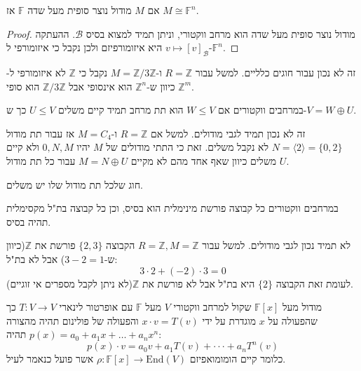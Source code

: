 \documentclass{tstextbook}
\begin{document}
\begin{proposition}
אם \(M\) מודול נוצר סופית מעל שדה \(\mathbb{F}\) אז \(M\cong \mathbb{F}^{n}\).

\end{proposition}
\begin{proof}
מודול נוצר סופית מעל שדה הוא מרחב ווקטורי, וניתן תמיד למצוא בסיס \(\mathcal{B}\). ההעתקה \(v\mapsto[v]_{\mathcal{B}}\) היא איזומורפיזם ולכן נקבל כי איזומורפי ל-\(\mathbb{F}^{n}\).

\end{proof}
\begin{remark}
זה לא נכון עבור חוגים כלליים. למשל עבור \(R=\mathbb{Z}\) ו-\(M=\mathbb{Z} / 3\mathbb{Z}\) נקבל כי \(\mathbb{Z}\) לא איזומורפי ל-\(\mathbb{Z}^{m}\) כיוון ש-\(\mathbb{Z}^{n}\) הוא אינסופי אבל \(\mathbb{Z} / 3\mathbb{Z}\) הוא סופי.

\end{remark}
\begin{reminder}
במרחבים ווקטורים אם \(W\leq V\) הוא תת מרחב תמיד קיים משלים \(U\leq V\) כך ש-\(V=W\oplus U\).

\end{reminder}
\begin{remark}
זה לא נכון תמיד לגבי מודולים. למשל אם \(R=\mathbb{Z}\) ו-\(M=C_{4}\) אז עבור תת מודול \(N=\langle 2 \rangle=\{ 0,2 \}\) לא נקבל משלים. זאת כי התתי מודולים של \(M\) יהיו \(0,N,M\) ולא קיים משלים כיוון שאף אחד מהם לא מקיים \(M=N\oplus U\) עבור כל תת מודול \(U\).

\end{remark}
\begin{definition}
חוג שלכל תת מודול שלו יש משלים.

\end{definition}
\begin{reminder}
במרחבים ווקטורים כל קבוצה פורשת מינימלית הוא בסיס, וכן כל קבוצה בת"ל מקסימלית תהיה בסיס.

\end{reminder}
\begin{remark}
לא תמיד נכון לגבי מודולים. למשל עבור \(R=\mathbb{Z},M=\mathbb{Z}\) הקבוצה \(\{ 2,3 \}\) פורשת את \(\mathbb{Z}\)(כיוון ש-\(3-2=1\)) אבל לא בת"ל:
$$3\cdot 2+(-2)\cdot 3 = 0$$
לעומת זאת הקבוצה \(\{ 2 \}\) היא בת"ל אבל לא פורשת את \(\mathbb{Z}\)(לא ניתן לקבל מספרים אי זוגיים).

\end{remark}
\begin{proposition}
מודול מעל \(\mathbb{F}[x]\) שקול למרחב ווקטורי \(V\) מעל \(\mathbb{F}\) עם אופרטור לינארי \(T:V\to V\) כך שהפעולה על \(x\) מוגדרת על ידי \(x \cdot v = T(v)\) והפעולה של פולינום תהיה מהצורה \(p(x)=a_{0}+a_{1}x+\dots + a_{n}x^{n}\) תהיה:
$$p(x)\cdot v=a_{0}v+a_{1}T(v)+\cdot\cdot\cdot+a_{n}T^{n}(v)$$
כלומר קיים הומומואפיזם \(\rho:\mathbb{F}[x]\to \mathrm{End}(V)\) אשר פועל כנאמר לעיל.

\end{proposition}
\end{document}
